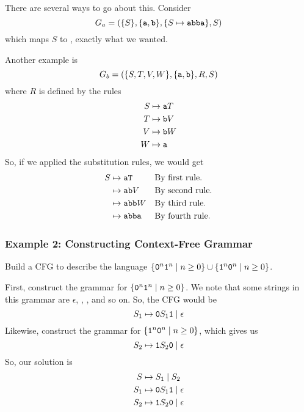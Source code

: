 \documentclass[letterpaper]{article}
\begin{document}
\begin{mdframed}[]
    There are several ways to go about this. Consider
    \[G_a = (\{S\}, \{\texttt{a}, \texttt{b}\}, \{S \mapsto \texttt{abba}\}, S)\]
    which maps $S$ to , exactly what we wanted. 

    \bigskip 

    Another example is 
    \[G_b = (\{S, T, V, W\}, \{\texttt{a}, \texttt{b}\}, R, S)\]
    where $R$ is defined by the rules 
    \begin{equation*}
        \begin{aligned}
            S &\mapsto \texttt{a}T \\ 
            T &\mapsto \texttt{b}V \\ 
            V &\mapsto \texttt{b}W \\ 
            W &\mapsto \texttt{a}
        \end{aligned}
    \end{equation*}
    So, if we applied the substitution rules, we would get 
    \begin{equation*}
        \begin{aligned}
            S &\mapsto \texttt{aT} && \text{By first rule.} \\ 
                &\mapsto \texttt{ab}V && \text{By second rule.} \\ 
                &\mapsto \texttt{abb}W && \text{By third rule.} \\ 
                &\mapsto \texttt{abba} && \text{By fourth rule.}
        \end{aligned}
    \end{equation*}
\end{mdframed}

\subsubsection{Example 2: Constructing Context-Free Grammar}
Build a CFG to describe the language $\{\texttt{0}^n \texttt{1}^n \mid n \geq 0\} \cup \{\texttt{1}^n \texttt{0}^n \mid n \geq 0\}$. 

\begin{mdframed}[]
    First, construct the grammar for $\{\texttt{0}^n \texttt{1}^n \mid n \geq 0\}$. We note that some strings in this grammar are $\epsilon$, , , and so on. So, the CFG would be  
    \[S_1 \mapsto \texttt{0}S_1 \texttt{1} \mid \epsilon\]
    Likewise, construct the grammar for $\{\texttt{1}^n \texttt{0}^n \mid n \geq 0\}$, which gives us 
    \[S_2 \mapsto \texttt{1}S_2 \texttt{0} \mid \epsilon\]
    So, our solution is 
    \begin{equation*}
        \begin{aligned}
            S &\mapsto S_1 \mid S_2 \\ 
            S_1 &\mapsto \texttt{0}S_1 \texttt{1} \mid \epsilon \\ 
            S_2 &\mapsto \texttt{1}S_2 \texttt{0} \mid \epsilon
        \end{aligned}
    \end{equation*}
\end{mdframed}
\end{document}
